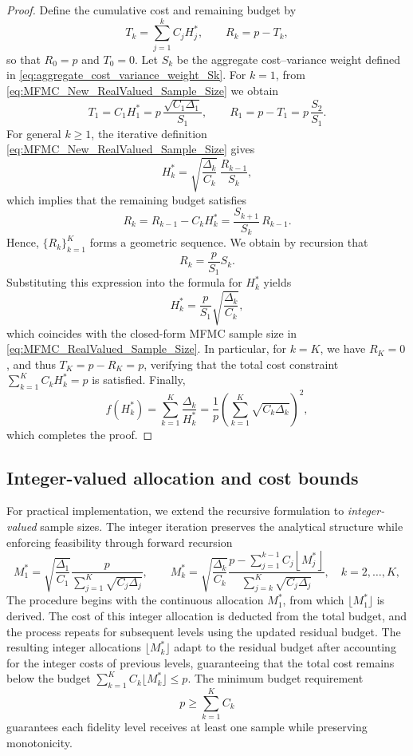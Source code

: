 \begin{proof}
Define the cumulative cost and remaining budget by
\[
    T_k = \sum_{j=1}^k C_j H_j^*, 
    \qquad 
    R_k = p - T_k,
\]
so that $R_0 = p$ and $T_0 = 0$. Let $S_k$ be the aggregate cost–variance weight defined in \eqref{eq:aggregate_cost_variance_weight_Sk}. For $k=1$, from \eqref{eq:MFMC_New_RealValued_Sample_Size} we obtain
%
\[
    T_1 = C_1H_1^* 
    = p\,\frac{\sqrt{C_1\Delta_1}}{S_1},
    \qquad
    R_1 = p - T_1
    = p\,\frac{S_2}{S_1}.
\]
%
For general $k\ge 1$, the iterative definition \eqref{eq:MFMC_New_RealValued_Sample_Size} gives
\[
    H_k^*
    = \sqrt{\frac{\Delta_k}{C_k}}\,
      \frac{R_{k-1}}{S_k},
\]
which implies that the remaining budget satisfies
\[
    R_k 
    = R_{k-1} - C_k H_k^*
    = \frac{S_{k+1}}
           {S_k} \, R_{k-1}.
\]
Hence, $\{R_k\}_{k=1}^K$ forms a geometric sequence. We obtain by recursion that
\[
    R_k = \frac{p}{S_1}S_k.
\]
Substituting this expression into the formula for $H_k^*$ yields
\[
    H_k^*
    = \frac{p}{S_1}\sqrt{\frac{\Delta_k}{C_k}},
\]
which coincides with the closed-form MFMC sample size in \eqref{eq:MFMC_RealValued_Sample_Size}.  
In particular, for $k=K$, we have $R_K=0$, and thus $T_K = p - R_K = p$, verifying that the total cost constraint $\sum_{k=1}^K C_k H_k^* = p$ is satisfied.  
Finally,
\[
    f(H_k^*)
    = \sum_{k=1}^K \frac{\Delta_k}{H_k^*}
    = \frac{1}{p} \left(\sum_{k=1}^K \sqrt{C_k\Delta_k}\right)^2,
\]
which completes the proof.
\end{proof}


\subsection{Integer-valued allocation and cost bounds}

For practical implementation, we extend the recursive formulation to {\it integer-valued} sample sizes. The integer iteration preserves the analytical structure while enforcing feasibility through forward recursion
%
\begin{equation}\label{eq:MFMC_New_IntegerValued_Sample_Size}
    M_1^* = \sqrt{\frac{\Delta_1}{C_1}}\frac{p}{\sum_{j=1}^K\sqrt{C_j\Delta_j}}, 
    \qquad 
    M_k^* = \sqrt{\frac{\Delta_k}{C_k}}\frac{p-\sum_{j=1}^{k-1}C_j\left\lfloor M_j^* \right\rfloor}{\sum_{j=k}^K\sqrt{C_j\Delta_j}}, 
    \quad k = 2,\ldots, K,
\end{equation}
%
The procedure begins with the continuous allocation $M_1^*$, from which $\lfloor M_1^* \rfloor$ is derived. The cost of this integer allocation is deducted from the total budget, and the process repeats for subsequent levels using the updated residual budget. The resulting integer allocations $\lfloor M_k^*\rfloor$ adapt to the residual budget after accounting for the integer costs of previous levels, guaranteeing that the total cost remains below the budget $\sum_{k=1}^K C_k\lfloor M_k^*\rfloor \le p$. The minimum budget requirement 
%
\begin{equation}\label{eq:p_bound}
    p \ge \sum_{k=1}^K C_k
\end{equation}
%
guarantees each fidelity level receives at least one sample while preserving monotonicity.


